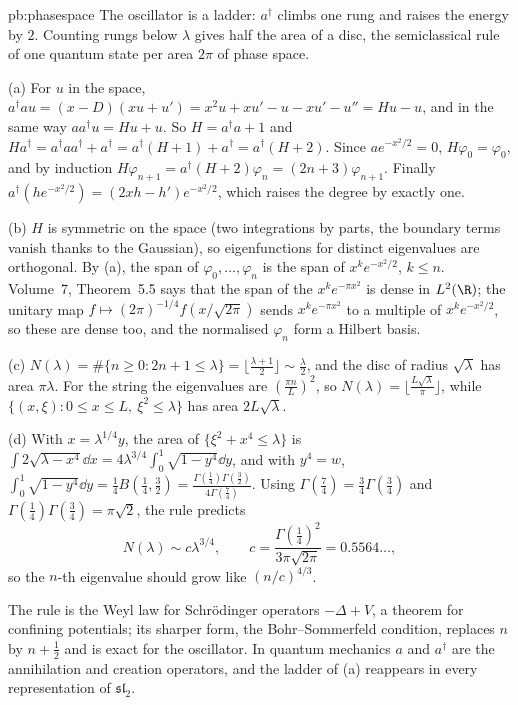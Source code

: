 \begin{solution}{pb:phasespace}
\idea The oscillator is a ladder: $a^\dagger$ climbs one rung and raises the energy by $2$. Counting rungs below $\lambda$ gives half the area of a disc, the semiclassical rule of one quantum state per
area $2\pi$ of phase space.

\writeup (a) For $u$ in the space, $a^\dagger au=(x-D)(xu+u')=x^2u+xu'-u-xu'-u''=Hu-u$, and in the same way $aa^\dagger u=Hu+u$. So $H=a^\dagger a+1$ and
$Ha^\dagger=a^\dagger aa^\dagger+a^\dagger=a^\dagger(H+1)+a^\dagger=a^\dagger(H+2)$. Since $ae^{-x^2/2}=0$, $H\varphi_0=\varphi_0$, and by induction
$H\varphi_{n+1}=a^\dagger(H+2)\varphi_n=(2n+3)\varphi_{n+1}$. Finally $a^\dagger(he^{-x^2/2})=(2xh-h')e^{-x^2/2}$, which raises the degree by exactly one.

(b) $H$ is symmetric on the space (two integrations by parts, the boundary terms vanish thanks to the Gaussian), so eigenfunctions for distinct eigenvalues are orthogonal. By (a), the span of
$\varphi_0,\dots,\varphi_n$ is the span of $x^ke^{-x^2/2}$, $k\le n$. Volume~7, Theorem~5.5 says that the span of the $x^ke^{-\pi x^2}$ is dense in $L^2(\R)$; the unitary map
$f\mapsto(2\pi)^{-1/4}f(x/\sqrt{2\pi})$ sends $x^ke^{-\pi x^2}$ to a multiple of $x^ke^{-x^2/2}$, so these are dense too, and the normalised $\varphi_n$ form a Hilbert basis.

(c) $N(\lambda)=\#\{n\ge0:2n+1\le\lambda\}=\lfloor\frac{\lambda+1}2\rfloor\sim\frac\lambda2$, and the disc of radius $\sqrt\lambda$ has area $\pi\lambda$. For the string the eigenvalues are $(\frac{\pi n}L)^2$, so
$N(\lambda)=\lfloor\frac{L\sqrt\lambda}\pi\rfloor$, while $\{(x,\xi):0\le x\le L,\ \xi^2\le\lambda\}$ has area $2L\sqrt\lambda$.

(d) With $x=\lambda^{1/4}y$, the area of $\{\xi^2+x^4\le\lambda\}$ is $\int2\sqrt{\lambda-x^4}\dd x=4\lambda^{3/4}\int_0^1\sqrt{1-y^4}\dd y$, and with $y^4=w$,
$\int_0^1\sqrt{1-y^4}\dd y=\frac14B(\frac14,\frac32)=\frac{\Gamma(\frac14)\Gamma(\frac32)}{4\Gamma(\frac74)}$. Using $\Gamma(\frac74)=\frac34\Gamma(\frac34)$ and $\Gamma(\frac14)\Gamma(\frac34)=\pi\sqrt2$, the rule
predicts
\[
N(\lambda)\sim c\lambda^{3/4},\qquad c=\frac{\Gamma(\frac14)^2}{3\pi\sqrt{2\pi}}=0.5564\ldots,
\]
so the $n$-th eigenvalue should grow like $(n/c)^{4/3}$.

\leads The rule is the Weyl law for Schrödinger operators $-\Delta+V$, a theorem for confining potentials; its sharper form, the Bohr--Sommerfeld condition, replaces $n$ by $n+\frac12$ and is exact
for the oscillator. In quantum mechanics $a$ and $a^\dagger$ are the annihilation and creation operators, and the ladder of (a) reappears in every representation of $\mathfrak{sl}_2$.
\end{solution}

